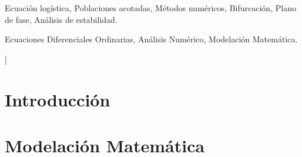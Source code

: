 \documentclass[a4paper,10pt,twocolumn]{article}
\begin{document}
\begin{keywords}
	Ecuación logística,
	Poblaciones acotadas,
	Métodos numéricos,
	Bifurcación,
	Plano de fase,
	Análisis de estabilidad.
\end{keywords}

\begin{topics}
	Ecuaciones Diferenciales Ordinarias, Análisis Numérico, Modelación Matemática.
\end{topics}


\vspace{0.8cm}
]




\section{Introducción}\label{sec:intro}



\section{Modelación Matemática}\label{sec:modelacion}
\end{document}
